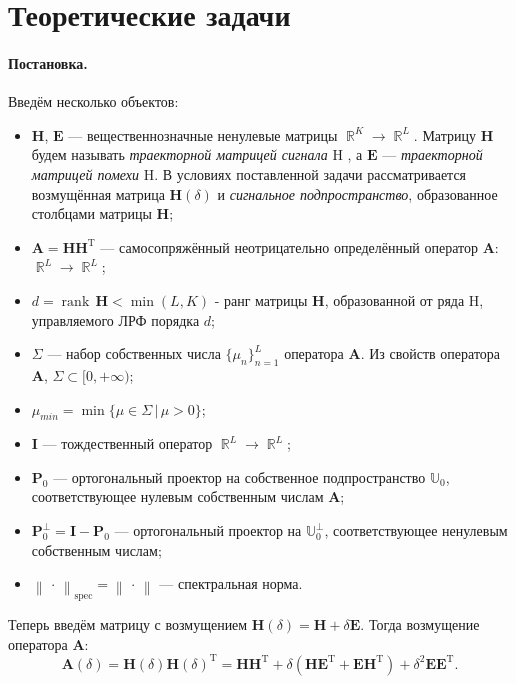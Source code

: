 \documentclass[specialist,
substylefile = spbu_report.rtx,
subf,href,colorlinks=true, 12pt]{disser}
\newcommand\norm[1]{\left\|#1\right\|}
\DeclareMathOperator\R{\mathbb{R}}
\DeclareMathOperator\rank{\textrm{rank}\,}
\newenvironment{statement}{\paragraph{Постановка.}}{\hfill}
\begin{document}
	\section{Теоретические задачи}
	\begin{statement}
		Введём несколько объектов:
		\begin{itemize}
			\item $\mathbf{H}$, $\mathbf{E}$ --- вещественнозначные ненулевые матрицы $\R^K \rightarrow \R^L$. Матрицу $\mathbf{H}$ будем называть \emph{траекторной матрицей сигнала} $\mathrm{H}$ , а $\mathbf{E}$ --- \emph{траекторной матрицей помехи} $\mathrm{H}$. В условиях поставленной задачи рассматривается возмущённая матрица $\mathbf{H}(\delta)$ и \emph{сигнальное подпространство}, образованное столбцами матрицы $\mathbf{H}$;
			\item  $\mathbf{A} = \mathbf{HH}^\mathrm{T}$ --- самосопряжённый неотрицательно определённый оператор $\mathbf{A}$: $\R^L \rightarrow \R^L$;
			\item $d = \rank\mathbf{H} < \min(L, K)$ - ранг матрицы $\mathbf{H}$, образованной от ряда $\mathrm{H}$, управляемого ЛРФ порядка $d$;
			\item $\Sigma$ --- набор собственных числа $\{\mu_n\}_{n=1}^L$ оператора $\mathbf{A}$. Из свойств оператора $\mathbf{A}$, $\Sigma \subset [0, +\infty)$;
			\item $\mu_{min} = \min\{\mu\in\Sigma\, |\, \mu > 0\}$;
			\item $\mathbf{I}$ --- тождественный оператор $\R^L \rightarrow \R^L$;
			\item $\mathbf{P}_0$ --- ортогональный проектор на собственное подпространство $\mathbb{U}_0$, соответствующее нулевым собственным числам $\mathbf{A}$;
			\item $\mathbf{P}^\bot_0 = \mathbf{I} - \mathbf{P}_0$ --- ортогональный проектор на $\mathbb{U}_0^\bot$, соответствующее ненулевым собственным числам;
			\item $\norm{\,\cdot\,}_{\mathrm{spec}}=\norm{\,\cdot\,}$ --- спектральная норма.
		\end{itemize}
		Теперь введём матрицу с возмущением $\mathbf{H}(\delta) = \mathbf{H} + \delta\mathbf{E}$. Тогда возмущение оператора $\mathbf{A}$:
		\begin{equation*}
			\mathbf{A}(\delta) = \mathbf{H}(\delta)\mathbf{H}(\delta)^\mathrm{T} = \mathbf{H}\mathbf{H}^\mathrm{T} + \delta(\mathbf{H}\mathbf{E}^\mathrm{T} + \mathbf{E}\mathbf{H}^\mathrm{T}) + \delta^2\mathbf{E}\mathbf{E}^\mathrm{T}.
		\end{equation*}

\end{statement}
\end{document}
